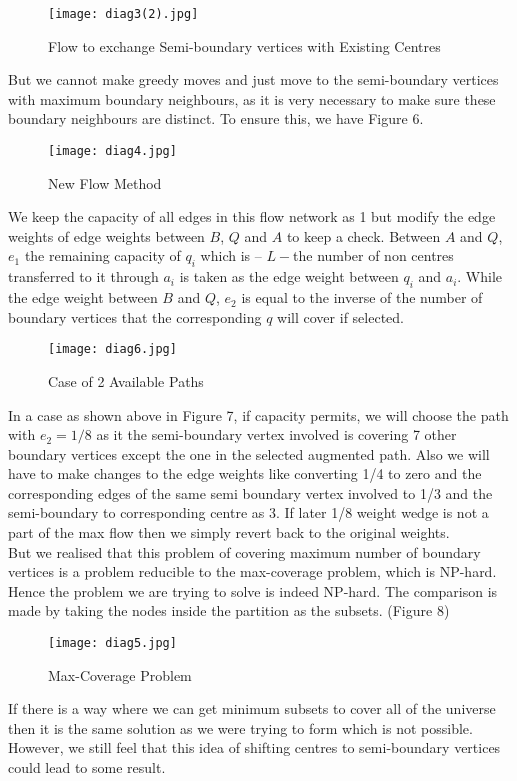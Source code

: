 \documentclass[12pt,a4paper,onecolumn]{article}
\begin{document}
\begin{itemize}
\begin{flushleft}
\begin{figure}[H]
\texttt{[image: diag3(2).jpg]}
\caption{Flow to exchange Semi-boundary vertices with Existing Centres}
\end{figure}
\end{flushleft}
But we cannot make greedy moves and just move to the semi-boundary vertices with maximum boundary neighbours, as it is very necessary to make sure these boundary neighbours are distinct. To ensure this, we have Figure 6.
\begin{center}
\begin{figure}[H]
\texttt{[image: diag4.jpg]}
\caption{New Flow Method}
\end{figure}\end{center}
We keep the capacity of all edges in this flow network as 1 but modify the edge weights of edge weights between $B$, $Q$ and $A$ to keep a check. Between $A$ and $Q$, $e_1$ the remaining capacity of $q_i$ which is -- $L-$the number of non centres transferred to it through $a_i$ is taken as the edge weight between $q_i$ and $a_i$. While the edge weight between $B$ and $Q$, $e_2$ is equal to the inverse of the number of boundary vertices that the corresponding $q$ will cover if selected. 
\begin{center}
\begin{figure}[H]
\texttt{[image: diag6.jpg]}
\caption{Case of 2 Available Paths}
\end{figure}

\end{center}
\vspace{0.1cm}
In a case as shown above in Figure 7, if capacity permits, we will choose the path with $e_2 = 1/8$ as it the semi-boundary vertex involved is covering 7 other boundary vertices except the one in the selected augmented path. Also we will have to make changes to the edge weights like converting 1/4 to zero and the corresponding edges of the same semi boundary vertex involved to 1/3 and the semi-boundary to corresponding centre as 3. If later 1/8 weight wedge is not a part of the max flow then we simply revert back to the original weights.\\
But we realised that this problem of covering maximum number of boundary vertices is a problem reducible to the max-coverage problem, which is NP-hard. Hence the problem we are trying to solve is indeed NP-hard. The comparison is made by taking the nodes inside the partition as the subsets. (Figure 8)
\begin{center}
\begin{figure}[H]
\texttt{[image: diag5.jpg]}
\caption{Max-Coverage Problem}
\end{figure}
\end{center}
If there is a way where we can get minimum subsets to cover all of the universe then it is the same solution as we were trying to form which is not possible. However, we still feel that this idea of shifting centres to semi-boundary vertices could lead to some result. 
\end{itemize}
\end{document}
